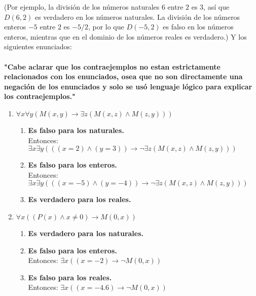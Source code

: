 \documentclass[a4paper,10pt]{article}
\begin{document}
\begin{enumerate}
  (Por ejemplo, la divisi\'on de los n\'umeros naturales $6$ entre $2$ es $3$, as\'i que $D(6,2)$ es verdadero en los n\'umeros naturales. La divisi\'on de los n\'umeros enteros $-5$ entre $2$ es $-5/2$, por lo que $D(-5,2)$ es falso en los n\'umeros enteros, mientras que en el dominio de los n\'umeros reales es verdadero.)
  Y los siguientes enunciados:\\\\
  \textbf{"Cabe aclarar que los contraejemplos no estan estrictamente relacionados con los enunciados, osea que no son directamente una negación de los enunciados y solo se usó lenguaje lógico para explicar los contraejemplos."}\\
  \begin{enumerate}[label=\arabic*)]
    \item $\forall x \forall y \left(M\left(x,y\right) \to \exists z\left(M\left(x,z\right) \wedge M\left(z,y\right)\right)\right)$
    \begin{enumerate}[label=\alph*)]
      \item \textbf{Es falso para los naturales.}\\
      Entonces: $\exists x \exists y (((x = 2) \wedge (y = 3)) \to \neg \exists z (M(x,z) \wedge M (z,y)))$
      \item \textbf{Es falso para los enteros.}\\
      Entonces: $\exists x \exists y (((x = -5) \wedge (y = -4)) \to \neg \exists z (M(x,z) \wedge M (z,y)))$
      \item \textbf{Es verdadero para los reales.}\\
    \end{enumerate}

    \item $\forall x \left(\left(P\left(x\right) \wedge x \neq 0\right) \to M\left(0,x\right)\right)$
    \begin{enumerate}[label=\alph*)]
      \item \textbf{Es verdadero para los naturales.}
      \item \textbf{Es falso para los enteros.}\\
      Entonces: $\exists x ((x = -2) \to \neg M(0,x))$
      \item \textbf{Es falso para los reales.}\\
      Entonces: $\exists x ((x = -4.6) \to \neg M(0,x))$\\
    \end{enumerate}


\end{enumerate}
\end{enumerate}
\end{document}
